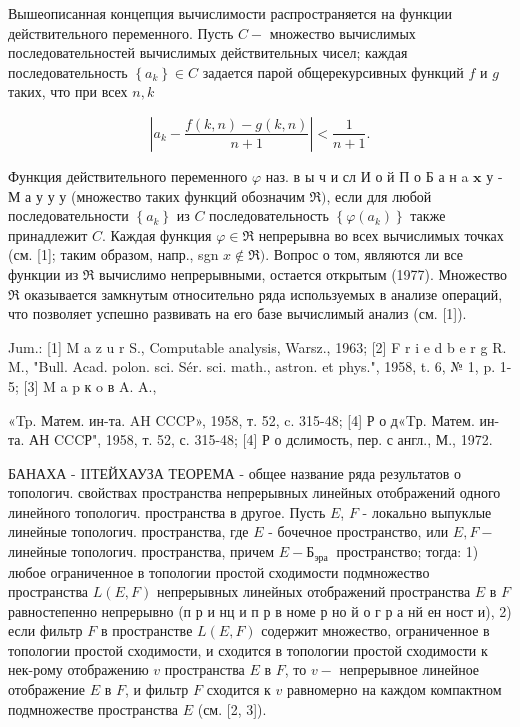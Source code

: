 \documentclass[10pt]{article}
\begin{document}
Вышеописанная концепция вычислимости распространяется на функции действительного переменного. Пусть $C-$ множество вычислимых последовательностей вычислимых действительных чисел; каждая последовательность $\left\{a_{k}\right\} \in C$ задается парой общерекурсивных функций $f$ и $g$ таких, что при всех $n, k$



\[

\left|a_{k}-\frac{f(k, n)-g(k, n)}{n+1}\right|<\frac{1}{n+1} .

\]



Функция действительного переменного $\varphi$ наз. в ы ч и сл И о й П о Б а н a $\mathbf{x}$ у - М а у у у (множество таких функций обозначим $\mathfrak{R})$, если для любой последовательности $\left\{a_{k}\right\}$ из $C$ последовательность $\left\{\varphi\left(a_{k}\right)\right\}$ также принадлежит $C$. Каждая функция $\varphi \in \mathfrak{R}$ непрерывна во всех вычислимых точках (см. [1]; таким образом, напр., sgn $x \notin \mathfrak{R})$. Вопрос о том, являются ли все функции из $\mathfrak{\Re}$ вычислимо непрерывными, остается открытым (1977). Множество $\mathfrak{R}$ оказывается замкнутым относительно ряда используемых в анализе операций, что позволяет успешно развивать на его базе вычислимый анализ (см. [1]).



Jum.: [1] M a z u r S., Computable analysis, Warsz., 1963; [2] F r i e d b e r g R. M., "Bull. Acad. polon. sci. Sér. sci. math., astron. et phys.", 1958, t. 6, № 1, p. 1-5; [3] M a p к o в A. A.,

«Tp. Матем. ин-та. AH CCCP», 1958, т. 52, c. 315-48; [4] Р о д«Tр. Матем. ин-та. АН CCCР", 1958, т. 52, с. 315-48; [4] Р о дслимость, пер. с англ., М., 1972.



БАНАХА - IIТЕЙХАУЗА ТЕОРЕМА - общее название ряда результатов о топологич. свойствах пространства непрерывных линейных отображений одного линейного топологич. пространства в другое. Пусть $E$, $F$ - локально выпуклые линейные топологич. пространства, где $E$ - бочечное пространство, или $E, F-$ линейные топологич. пространства, причем $E-Б_{\text {эра }}$ пространство; тогда: 1) любое ограниченное в топологии простой сходимости подмножество пространства $L(E, F)$ непрерывных линейных отображений пространства $E$ в $F$ равностепенно непрерывно (п р и нц и п р в номе р но й о г р а нй ен ност и), 2) если фильтр $F$ в пространстве $L(E, F)$ содержит множество, ограниченное в топологии простой сходимости, и сходится в топологии простой сходимости к нек-рому отображению $v$ пространства $E$ в $F$, то $v-$ непрерывное линейное отображение $E$ в $F$, и фильтр $F$ сходится к $v$ равномерно на каждом компактном подмножестве пространства $E$ (см. [2, 3]).
\end{document}
